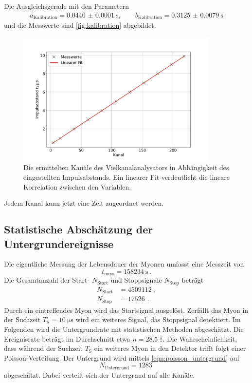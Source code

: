 Die Ausgleichsgerade mit den Parametern
\begin{align*}
    a_\text{Kalibration} = \qty{0.0440(00001)}{\second}, \qquad b_\text{Kalibration} = \qty{0.3125(00079)}{\second}
\end{align*}
und die Messwerte sind \autoref{fig:kalibration} abgebildet.
\begin{figure}
    \centering
    \includegraphics[width=0.9\textwidth]{content/plots/calibration.pdf}
    \caption{Die ermittelten Kanäle des Vielkanalanalysators in Abhängigkeit des eingestellten Impulsabstands.
    Ein linearer Fit verdeutlicht die lineare Korrelation zwischen den Variablen.
    }
    \label{fig:kalibration}
\end{figure}
Jedem Kanal kann jetzt eine Zeit zugeordnet werden.
\FloatBarrier

\subsection{Statistische Abschätzung der Untergrundereignisse}
\label{sec:untergrund}
Die eigentliche Messung der Lebensdauer der Myonen umfasst eine Messzeit von
\begin{equation*}
    t_\text{mess} = \qty{158234}{\second} \,.
\end{equation*}
Die Gesamtanzahl der Start- $N_\text{Start}$ und Stoppsignale $N_\text{Stop}$ beträgt
\begin{align*}
    N_\text{Start} &= \qty{4509112}{}, \\
    N_\text{Stop} &= \qty{17526}{} \,.
\end{align*}
Durch ein eintreffendes Myon wird das Startsignal ausgelöst.
Zerfällt das Myon in der Suchzeit $T_\text{S} = \qty{10}{\micro\second}$ wird ein weiteres Signal, das Stoppsignal detektiert.
Im Folgenden wird die Untergrundrate mit statistischen Methoden abgeschätzt.
Die Ereignisrate beträgt im Durchschnitt etwa $n = \qty{28.5}{\frac{1}{\second}}$.
Die Wahrscheinlichkeit, dass während der Suchzeit $T_\text{S}$ ein weiteres Myon in den Detektor trifft folgt einer Poisson-Verteilung.  
Der Untergrund wird mittels \autoref{eqn:poisson_untergrund} auf
\begin{equation}
    N_\text{Untergrund} = \qty{1283}{}
    \label{eqn:untergrund}
\end{equation}
abgeschätzt.
Dabei verteilt sich der Untergrund auf alle Kanäle.
\FloatBarrier


